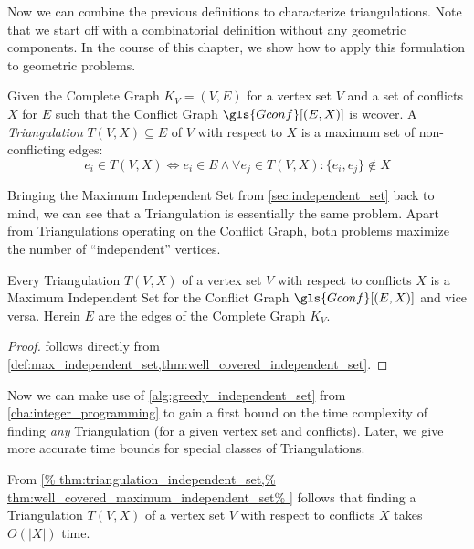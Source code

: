 Now we can combine the previous definitions to characterize
triangulations. Note that we start off with a combinatorial
definition without any geometric components. In the course of this
chapter, we show how to apply this formulation to geometric problems.

\begin{definition}[Triangulation]
  Given the Complete Graph \(K_V = (V,E)\) for a vertex set \(V\)
  and a set of conflicts \(X\) for \(E\)
  such that the Conflict Graph \(\gls{Gconf}[(E,X)]\) is \gls{wcover}.
  A \emph{Triangulation} \(T(V,X) \subseteq E\) of \(V\) with respect
  to \(X\) is a maximum set of non-conflicting edges:
  \[
    e_i \in T(V,X)
    \iff e_i \in E
    \land \forall e_j \in T(V,X) : \{e_i,e_j\} \not\in X
  \]
\end{definition}

Bringing the Maximum Independent Set from \cref{sec:independent_set}
back to mind, we can see that a Triangulation is essentially the same
problem. Apart from Triangulations operating on the Conflict Graph,
both problems maximize the number of ``independent'' vertices.

\begin{theorem}
  \label{thm:triangulation_independent_set}
  Every Triangulation \(T(V,X)\) of a vertex set \(V\) with respect
  to conflicts \(X\) is a Maximum Independent Set for the Conflict
  Graph \(\gls{Gconf}[(E,X)]\) and vice versa. Herein \(E\) are the
  edges of the Complete Graph \(K_V\).
  \begin{proof}
     follows directly from
    \cref{def:max_independent_set,thm:well_covered_independent_set}.
  \end{proof}
\end{theorem}

Now we can make use of \cref{alg:greedy_independent_set} from
\cref{cha:integer_programming} to gain a first bound on the time
complexity of finding \emph{any} Triangulation (for a given vertex
set and conflicts). Later, we give more accurate time bounds for
special classes of Triangulations.

\begin{theorem}
  \label{thm:time_complexity_triangulations}
  From
  \cref{%
    thm:triangulation_independent_set,%
    thm:well_covered_maximum_independent_set%
  }
  follows that finding a Triangulation \(T(V,X)\) of a vertex set
  \(V\) with respect to conflicts \(X\) takes \(O(|X|)\) time.
\end{theorem}

